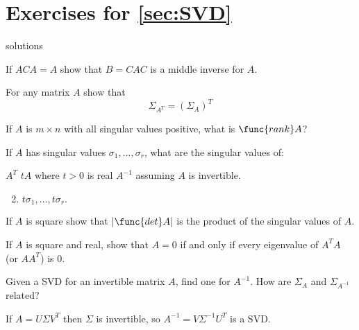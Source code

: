 
\section*{Exercises for \ref{sec:SVD}}

\begin{Filesave}{solutions}
\end{Filesave}

\begin{multicols}{2}
\begin{ex}
If $ACA=A$ show that $B=CAC$ is a middle inverse for $A$.
\end{ex} 

\begin{ex} 
For any matrix $A$ show that
\begin{equation*}
\Sigma_{A^{T}}=(\Sigma_{A})^{T}
\end{equation*}
\end{ex}

\begin{ex}
If $A$ is $m\times n$ with all singular values positive, what is $\func{rank}A$?
\end{ex}

\begin{ex}
If $A$ has singular values $\sigma_{1},\dots ,\sigma_{r}$, what are the singular values of:

\begin{exenumerate}
\exitem $A^{T}$ 
\exitem $tA$ where $t>0$ is real
\exitem* $A^{-1}$ assuming $A$ is invertible.
\end{exenumerate}

\begin{sol}
\begin{enumerate}[label={\alph*.}]
\setcounter{enumi}{1}
\item $t\sigma _{1},\dots ,t\sigma _{r}.$
\end{enumerate}
\end{sol}
\end{ex}

\begin{ex}
If $A$ is square show that $| \func{det}A |$ is the product of the singular values of $A$.
\end{ex}

\begin{ex}
If $A$ is square and real, show that $A=0$ if and only if every eigenvalue of $A^T A$ (or $AA^T$) is $0$.
\end{ex} 

\begin{ex}
Given a SVD for an invertible matrix $A$, find one for $A^{-1}$. How are $\Sigma_{A}$ and $\Sigma_{A^{-1}}$ related?
\begin{sol}
If $A=U\Sigma V^{T}$ then $\Sigma$ is invertible, so $A^{-1}=V\Sigma^{-1}U^{T}$ is a SVD.
\end{sol}
\end{ex}


\end{multicols}
